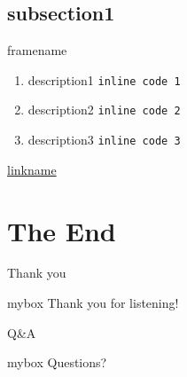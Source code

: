\documentclass[9pt,aspectratio=43,mathserif,table]{beamer}
\begin{document}
\subsection{subsection1}
\begin{frame}[fragile]{framename}
  \begin{enumerate}
    \item<0-> description1 \verb|inline code 1|
    \item<0-> description2 \verb|inline code 2|
    \item<0-> description3 \verb|inline code 3|
  \end{enumerate}
  \href{https://klee.github.io/docs/options/}{linkname}
\end{frame}


\section{The End}
\begin{frame}{Thank you}
  \begin{center}
    \begin{minipage}{1\textwidth}
      \begin{beamercolorbox}[wd=0.70\textwidth, rounded=true, shadow=true]{mybox}
        \LARGE \centering Thank you for listening!  %
      \end{beamercolorbox}
    \end{minipage}
  \end{center}
\end{frame}

\begin{frame}{Q\&A}
  \begin{center}
    \begin{minipage}{1\textwidth}
      \begin{beamercolorbox}[wd=0.70\textwidth, rounded=true, shadow=true]{mybox}
        \LARGE \centering  Questions?  %
      \end{beamercolorbox}
    \end{minipage}
  \end{center}
\end{frame}

\end{document}
